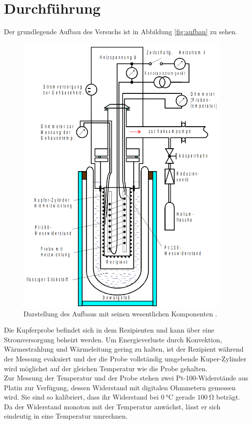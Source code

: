 \section{Durchführung}
\label{sec:Durchführung}

Der grundlegende Aufbau des Versuchs ist in Abbildung \ref{fig:aufbau} zu sehen.

\begin{figure}
  \centering
  \includegraphics[width=300pt]{data/aufbau.png}
  \caption{Darstellung des Aufbaus mit seinen wesentlichen Komponenten \cite{versuchsanleitung}.}
  \label{fig:phononen}
\end{figure}

Die Kupferprobe befindet sich in dem Rezipienten und kann über eine Stromversorgung beheizt werden. Um Energieverluste durch Konvektion, Wärmestrahlung und Wärmeleitung gering zu halten, ist der Rezipient während der Messung evakuiert und der die Probe vollständig umgebende Kuper-Zylinder wird möglichst auf der gleichen Temperatur wie die Probe gehalten.\\
Zur Messung der Temperatur und der Probe stehen zwei Pt-100-Widerstände aus Platin zur Verfügung, dessen Widerstand mit digitalen Ohmmetern gemessen wird. Sie sind so kalibriert, dass ihr Widerstand bei $\SI{0}{\celsius}$ gerade $\SI{100}{\ohm}$ beträgt. Da der Widerstand monoton mit der Temperatur anwächst, lässt er sich eindeutig in eine Temperatur umrechnen.

